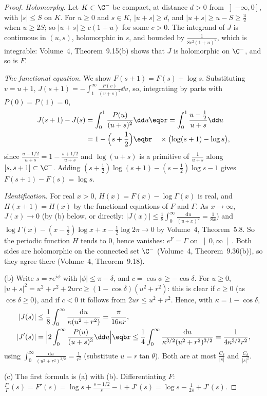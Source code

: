 \begin{proof}
\emph{Holomorphy.} Let $K\subset\C^-$ be compact, at distance $d>0$ from $\left]-\infty,0\right]$, with $|s|\le S$ on $K$. For $u\ge0$ and $s\in K$, $|u+s|\ge d$, and $|u+s|\ge u-S\ge\frac u2$ when
$u\ge2S$; so $|u+s|\ge c(1+u)$ for some $c>0$. The integrand of $J$ is continuous in $(u,s)$, holomorphic in $s$, and bounded by $\frac1{8c^2(1+u)^2}$, which is integrable:
Volume~4, Theorem~9.15(b) shows that $J$ is holomorphic on $\C^-$, and so is $F$.

\emph{The functional equation.} We show $F(s+1)=F(s)+\log s$. Substituting $v=u+1$, $J(s+1)=-\int_1^\infty\frac{P(v)}{(v+s)^2}\dd v$, so, integrating by parts with $P(0)=P(1)=0$,
\[
\begin{aligned}J(s+1)-J(s)&=\int_0^1\frac{P(u)}{(u+s)^2}\dd u\eqbr=\int_0^1\frac{u-\frac12}{u+s}\dd u\\&=1-\Bigl(s+\frac12\Bigr)\eqbr\quad\times\bigl(\log(s+1)-\log s\bigr),\end{aligned}
\]
since $\frac{u-1/2}{u+s}=1-\frac{s+1/2}{u+s}$ and $\log(u+s)$ is a primitive of $\frac1{u+s}$ along $[s,s+1]\subset\C^-$. Adding $(s+\frac12)\log(s+1)-(s-\frac12)\log s-1$ gives
$F(s+1)-F(s)=\log s$.

\emph{Identification.} For real $x>0$, $H(x)=F(x)-\log\Gamma(x)$ is real, and $H(x+1)=H(x)$ by the functional equations of $F$ and $\Gamma$. As $x\to\infty$, $J(x)\to0$
(by (b) below, or directly: $|J(x)|\le\frac18\int_0^\infty\frac{\mathrm du}{(u+x)^2}=\frac1{8x}$) and $\log\Gamma(x)-(x-\frac12)\log x+x-\frac12\log2\pi\to0$ by Volume~4, Theorem~5.8. So the
periodic function $H$ tends to $0$, hence vanishes: $e^F=\Gamma$ on $\left]0,\infty\right[$. Both sides are holomorphic on the connected set $\C^-$ (Volume~4, Theorem~9.36(b)), so they
agree there (Volume~4, Theorem~9.18).

(b) Write $s=re^{i\phi}$ with $|\phi|\le\pi-\delta$, and $c=\cos\phi\ge-\cos\delta$. For $u\ge0$, $|u+s|^2=u^2+r^2+2urc\ge(1-\cos\delta)(u^2+r^2)$: this is clear if $c\ge0$ (as $\cos\delta\ge0$), and if
$c<0$ it follows from $2ur\le u^2+r^2$. Hence, with $\kappa=1-\cos\delta$,
\[
\begin{aligned}|J(s)|&\le\frac18\int_0^\infty\frac{\mathrm du}{\kappa(u^2+r^2)}=\frac\pi{16\kappa r},\\|J'(s)|&=\Bigl|2\int_0^\infty\frac{P(u)}{(u+s)^3}\dd u\Bigr|\eqbr\le\frac14\int_0^\infty\frac{\mathrm du}{\kappa^{3/2}(u^2+r^2)^{3/2}}=\frac1{4\kappa^{3/2}r^2},\end{aligned}
\]
using $\int_0^\infty\frac{\mathrm du}{(u^2+r^2)^{3/2}}=\frac1{r^2}$ (substitute $u=r\tan\theta$). Both are at most $\frac{C_\delta}{|s|}$ and $\frac{C_\delta}{|s|^2}$.

(c) The first formula is (a) with (b). Differentiating $F$: $\frac{\Gamma'}\Gamma(s)=F'(s)=\log s+\frac{s-1/2}s-1+J'(s)=\log s-\frac1{2s}+J'(s)$.
\end{proof}

